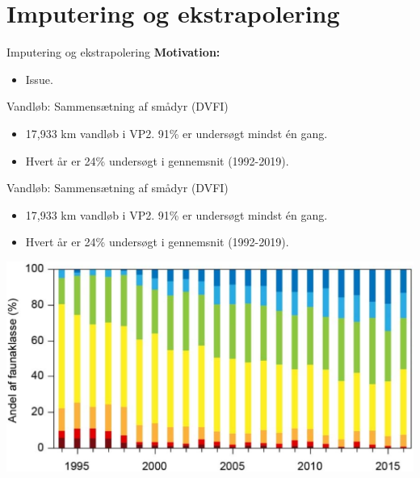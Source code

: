 \section{Imputering og ekstrapolering}

\begin{frame}{Imputering og ekstrapolering}
    \textbf{Motivation:}
    \begin{itemize}
      \item Issue.
    \end{itemize}
\end{frame}

\begin{frame}{Vandløb: Sammensætning af smådyr (DVFI)}
  \begin{itemize}
    \item 17,933 km vandløb i VP2. 91\% er undersøgt mindst én gang.
    \item Hvert år er 24\% undersøgt i gennemsnit (1992-2019).
  \end{itemize}
  \vfill
\end{frame}
\begin{frame}{Vandløb: Sammensætning af smådyr (DVFI)}
  \begin{itemize}
    \item 17,933 km vandløb i VP2. 91\% er undersøgt mindst én gang.
    \item Hvert år er 24\% undersøgt i gennemsnit (1992-2019).
  \end{itemize}
  \includegraphics[width=\textwidth]{figures/DVFI}
\end{frame}

